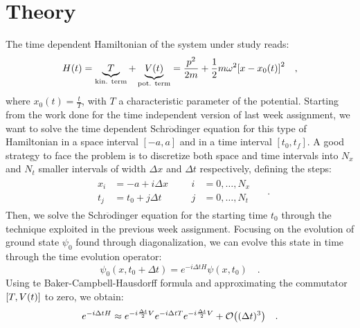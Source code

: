 \documentclass[pra, onecolumn, notitlepage, floats, 11pt]{revtex4-1}
\begin{document}
\section{Theory}
The time dependent Hamiltonian of the system under study reads:
\begin{equation}
    H(t)
    =
    \underbrace{T}_{\text{kin. term}} + \underbrace{V(t)}_{\text{pot. term}}
    =
    \frac{p^{2}}{2m} + \frac{1}{2} m\omega^{2}\qty[x - x_{0}(t)]^2
    \quad ,
    \label{eq:07_T_1}
\end{equation}
where \( x_{0}(t) = \frac{t}{T} \), with \( T \) a characteristic parameter of the potential. Starting from the work done for the time independent version of last week assignment, we want to solve the time dependent Schr$\mathrm{\ddot{o}}$dinger equation for this type of Hamiltonian in a space interval \( [-a,a] \) and in a time interval \( [t_{0},t_{f}] \).
A good strategy to face the problem is to discretize both space and time intervals into \( N_{x} \) and \( N_{t} \) smaller intervals of width \( \Delta x \) and \( \Delta t \) respectively, defining the steps:
\begin{equation}
    \begin{gathered}
        \begin{aligned}
            x_{i} &= -a + i\Delta x     &   &&   i&=0,\dots,N_{x}  \\
            t_{j} &= t_{0} + j\Delta t  &   &&   j&=0,\dots,N_{t}
        \end{aligned}
    \end{gathered}
    \quad .
    \label{eq:07_T_2}
\end{equation}
Then, we solve the Schr$\mathrm{\ddot{o}}$dinger equation for the starting time \( t_{0} \) through the technique exploited in the previous week assignment. Focusing on the evolution of ground state \( \psi_{0} \) found through diagonalization, we can evolve this state in time through the time evolution operator:
\begin{equation}
    \psi_{0}(x,t_{0}+\Delta t)
    =
    e^{-i\Delta t H} \psi(x,t_{0})
    \quad .
    \label{eq:07_T_3}
\end{equation}
Using te Baker-Campbell-Hausdorff formula and approximating the commutator \( \qty[T,V(t)] \) to zero, we obtain:
\begin{equation}
    e^{-i \Delta t H}
    \approx
    e^{- i \frac{\Delta t}{2} V} e^{- i \Delta t T} e^{- i \frac{\Delta t}{2} V}
    + \mathcal{O}\qty((\Delta t)^3)
    \quad .
    \label{eq:07_T_4}
\end{equation}
\end{document}
